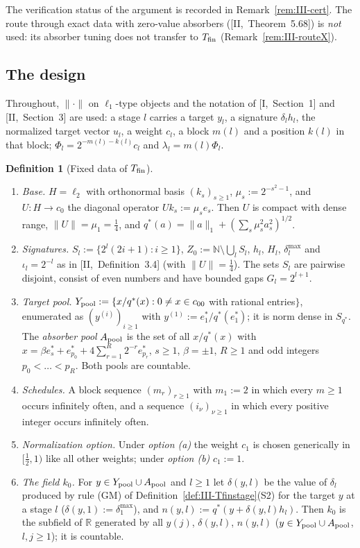 \documentclass[10pt]{amsart}
\theoremstyle{definition}
\newtheorem{definition}[theorem]{Definition}
\theoremstyle{remark}
\newcommand{\R}{\mathbb R}
\newcommand{\N}{\mathbb N}
\begin{document}
The verification status of the argument is recorded in
Remark~\ref{rem:III-cert}.  The route through exact data with zero-value
absorbers ([II,~Theorem~5.68]) is \emph{not} used: its absorber tuning
does not transfer to $T_{\rm fin}$ (Remark~\ref{rem:III-routeX}).

\subsection{The design}\label{sec:III-design}

Throughout, $\|\cdot\|$ on $\ell_1$-type objects and the notation of
[I,~Section~1] and [II,~Section~3] are used: a stage $l$ carries a target
$y_l$, a signature $\delta_lh_l$, the normalized target vector $u_l$, a
weight $c_l$, a block $m(l)$ and a position $k(l)$ in that block; $\Phi_l=
2^{-m(l)-k(l)}c_l$ and $\lambda_l=m(l)\Phi_l$.

\begin{definition}[Fixed data of $T_{\rm fin}$]\label{def:III-Tfindata}
\begin{enumerate}
\item[(i)] \emph{Base.}  $H=\ell_2$ with orthonormal basis $(k_s)_{s\ge1}$,
$\mu_s:=2^{-s^2-1}$, and $U:H\to c_0$ the diagonal operator $Uk_s:=\mu_se_s$.
Then $U$ is compact with dense range, $\|U\|=\mu_1=\frac14$, and
$q^*(a)=\|a\|_1+(\sum_s\mu_s^2a_s^2)^{1/2}$.
\item[(ii)] \emph{Signatures.}  $S_l:=\{2^l(2i+1):i\ge1\}$, $Z_0:=\N\setminus
\bigcup_lS_l$, $h_l$, $H_l$, $\delta^{\max}_l$ and $\iota_l=2^{-l}$ as in
[II,~Definition~3.4] (with $\|U\|=\frac14$).  The sets $S_l$ are pairwise
disjoint, consist of even numbers and have bounded gaps $G_l=2^{l+1}$.
\item[(iii)] \emph{Target pool.}  $Y_{\rm pool}:=\{x/q^*(x):0\ne x\in c_{00}$ with
rational entries$\}$, enumerated as $(y^{(i)})_{i\ge1}$ with $y^{(1)}:=
e^*_1/q^*(e^*_1)$; it is norm dense in $S_{q^*}$.  The \emph{absorber pool}
$A_{\rm pool}$ is the set of all $x/q^*(x)$ with $x=\beta e^*_s+e^*_{p_0}+
4\sum_{r=1}^R2^{-r}e^*_{p_r}$, $s\ge1$, $\beta=\pm1$, $R\ge1$ and odd integers
$p_0<\dots<p_R$.  Both pools are countable.
\item[(iv)] \emph{Schedules.}  A block sequence $(m_r)_{r\ge1}$ with $m_1:=2$ in
which every $m\ge1$ occurs infinitely often, and a sequence $(i_\nu)_{\nu\ge1}$
in which every positive integer occurs infinitely often.
\item[(v)] \emph{Normalization option.}  Under \emph{option (a)} the weight
$c_1$ is chosen generically in $[\frac12,1)$ like all other weights; under
\emph{option (b)} $c_1:=1$.
\item[(vi)] \emph{The field $k_0$.}  For $y\in Y_{\rm pool}\cup A_{\rm pool}$ and
$l\ge1$ let $\delta(y,l)$ be the value of $\delta_l$ produced by rule (GM) of
Definition~\ref{def:III-Tfinstage}(S2) for the target $y$ at a stage $l$
($\delta(y,1):=\delta^{\max}_1$), and $n(y,l):=q^*(y+\delta(y,l)h_l)$.  Then
$k_0$ is the subfield of $\R$ generated by all $y(j)$, $\delta(y,l)$, $n(y,l)$
\textup{(}$y\in Y_{\rm pool}\cup A_{\rm pool}$, $l,j\ge1$\textup{)}; it is countable.
\end{enumerate}
\end{definition}
\end{document}
